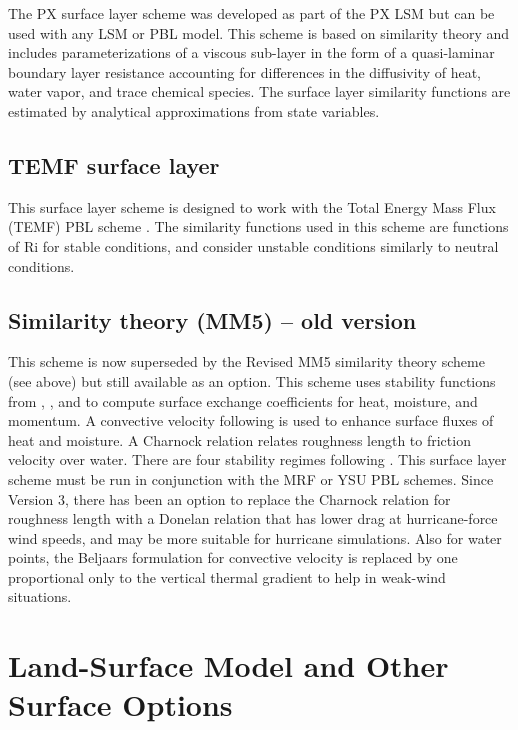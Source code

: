 The PX surface layer scheme \citep{pleim06} was developed as part of the PX LSM but can be used with any LSM or PBL model.  This scheme is based on similarity theory and includes parameterizations of a viscous sub-layer in the form of a quasi-laminar boundary layer resistance accounting for differences in the diffusivity of heat, water vapor, and trace chemical species.   The surface layer similarity functions are estimated by analytical approximations from state variables.  

\subsection{TEMF surface layer}

This surface layer scheme is designed to work with the Total Energy Mass Flux (TEMF) PBL scheme
\citep{angevine10}. The similarity functions used in this scheme are functions of Ri for stable conditions,
and consider unstable conditions similarly to neutral conditions.

\subsection{Similarity theory (MM5) -- old version}

This scheme is now superseded by the Revised MM5 similarity theory scheme
(see above) but still available as an option.
This scheme uses stability functions from \citet{paulson70}, \citet{dyer70}, 
and \citet{webb70}
to compute surface exchange coefficients for heat, moisture, and momentum. 
A convective velocity following \citet{beljaars94} is used to enhance surface 
fluxes of heat and moisture. A Charnock relation relates 
roughness length to friction velocity over water. There are four stability 
regimes following \citet{zhanganthes82}.
This surface layer scheme must be run in conjunction with the MRF or
YSU PBL schemes. Since Version 3, there has been an option to replace the Charnock
relation for roughness length with a Donelan relation that has lower
drag at hurricane-force wind speeds, and may be more suitable for hurricane
simulations. Also for water points, the Beljaars formulation for convective
velocity is replaced by one proportional only to the vertical thermal gradient
to help in weak-wind situations.



\section{Land-Surface Model and Other Surface Options}


